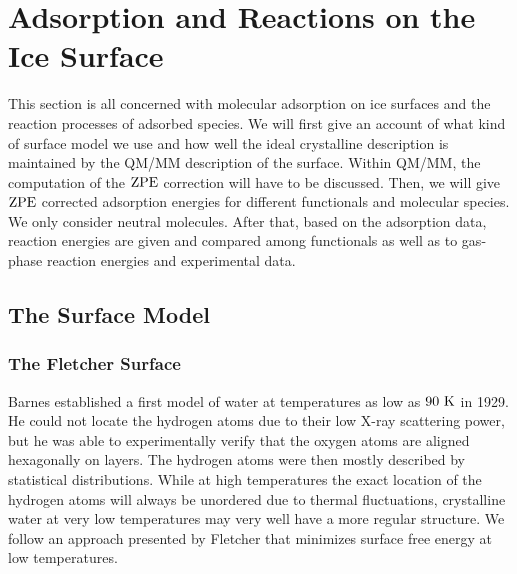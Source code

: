 \documentclass[8.5pt,twoside,twocolumn]{article}
\newcommand\zpe{\enmat{\te{ZPE}}}
\renewcommand\K{{\enmat{~\te{K}}}}
\theoremstyle{standard}
\begin{document}
\section{Adsorption and Reactions on the Ice Surface}
\label{Sec:Ads}

This section is all concerned with molecular adsorption on ice surfaces
and the reaction processes of adsorbed species. We will first give an
account of what kind of surface model we use and how well the ideal
crystalline description is maintained by the QM/MM description of
the surface. Within QM/MM, the computation of the $\zpe$ correction 
will have to be discussed. Then, we will give $\zpe$ corrected adsorption
energies for different functionals and molecular species. We only consider
neutral molecules.
After that, based on the adsorption data, reaction energies are given
and compared among functionals as well as to gas-phase reaction
energies and experimental data.

\subsection{The Surface Model}
\label{Sec:Ads:Model}

\subsubsection{The Fletcher Surface}
Barnes \cite{Barnes1929} established a first model of water at temperatures
as low as $90\K$ in 1929. He could not locate the hydrogen atoms due
to their low X-ray scattering power\cite{Fletcher1966}, but he was able
to experimentally verify that the oxygen atoms are aligned hexagonally
on layers. The hydrogen atoms were then mostly described by statistical
distributions. While at high temperatures the exact location of the hydrogen
atoms will always be unordered due to thermal fluctuations, crystalline
water at very low temperatures may very well have a more regular structure.
We follow an approach presented by Fletcher\cite{Fletcher1992} that minimizes
surface free energy at low temperatures.
\end{document}
